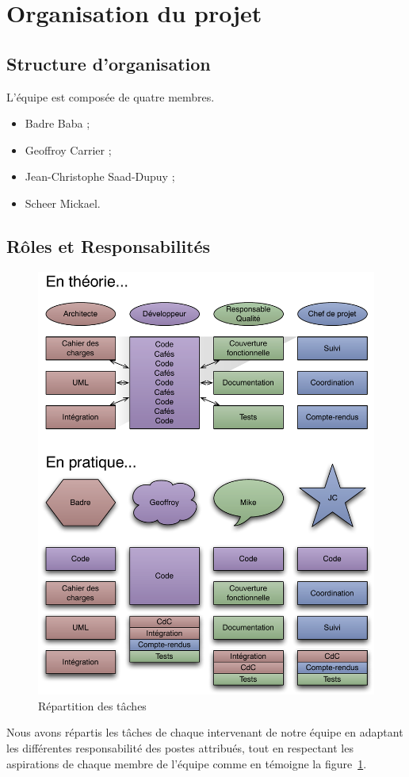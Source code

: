 \section{Organisation du projet}
\subsection{Structure d’organisation}
L'équipe est composée de quatre membres.
\begin{itemize}
	\item Badre Baba ;
	\item Geoffroy Carrier ;
	\item Jean-Christophe Saad-Dupuy ;
	\item Scheer Mickael.
\end{itemize}

\subsection{Rôles et Responsabilités}
\begin{figure}[thbp]
	\centering
		\includegraphics[width=15cm]{../diagrammes/repartition_taches.pdf}
	\caption{Répartition des tâches}
	\label{fig:repartition}
\end{figure}

Nous avons répartis les tâches de chaque intervenant de notre équipe en adaptant les différentes responsabilité des postes attribués, tout en respectant les aspirations de chaque membre de l'équipe comme en témoigne la figure~\ref{fig:repartition}.
